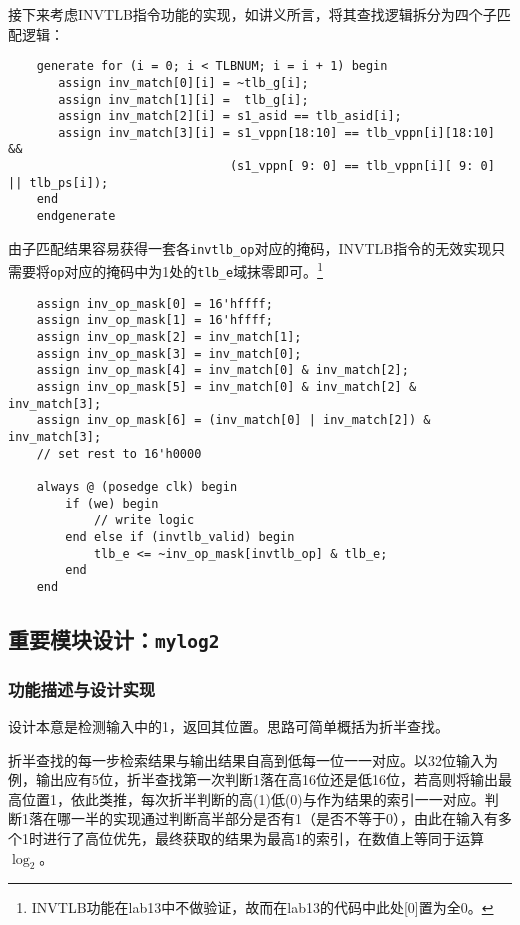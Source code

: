\documentclass[UTF-8,twoside,c5size]{ctexart}
\begin{document}
    接下来考虑INVTLB指令功能的实现，如讲义所言，将其查找逻辑拆分为四个子匹配逻辑：
    \begin{verbatim}
    generate for (i = 0; i < TLBNUM; i = i + 1) begin
       assign inv_match[0][i] = ~tlb_g[i];
       assign inv_match[1][i] =  tlb_g[i];
       assign inv_match[2][i] = s1_asid == tlb_asid[i];
       assign inv_match[3][i] = s1_vppn[18:10] == tlb_vppn[i][18:10]            &&
                               (s1_vppn[ 9: 0] == tlb_vppn[i][ 9: 0] || tlb_ps[i]);
    end        
    endgenerate
    \end{verbatim}
    
    由子匹配结果容易获得一套各\texttt{invtlb\_op}对应的掩码，INVTLB指令的无效实现只需要将\texttt{op}对应的掩码中为1处的\texttt{tlb\_e}域抹零即可。\footnote{INVTLB功能在lab13中不做验证，故而在lab13的代码中此处[0]置为全0。}
    
    \begin{verbatim}
    assign inv_op_mask[0] = 16'hffff;
    assign inv_op_mask[1] = 16'hffff;
    assign inv_op_mask[2] = inv_match[1];
    assign inv_op_mask[3] = inv_match[0];
    assign inv_op_mask[4] = inv_match[0] & inv_match[2];
    assign inv_op_mask[5] = inv_match[0] & inv_match[2] & inv_match[3];
    assign inv_op_mask[6] = (inv_match[0] | inv_match[2]) & inv_match[3];
    // set rest to 16'h0000
    
    always @ (posedge clk) begin
        if (we) begin
            // write logic
        end else if (invtlb_valid) begin
            tlb_e <= ~inv_op_mask[invtlb_op] & tlb_e;
        end
    end
    \end{verbatim}
    
    \subsection{重要模块设计：\texttt{mylog2}}
    \subsubsection{功能描述与设计实现}
    
    设计本意是检测输入中的1，返回其位置。思路可简单概括为折半查找。
    
    折半查找的每一步检索结果与输出结果自高到低每一位一一对应。以32位输入为例，输出应有5位，折半查找第一次判断1落在高16位还是低16位，若高则将输出最高位置1，依此类推，每次折半判断的高(1)低(0)与作为结果的索引一一对应。判断1落在哪一半的实现通过判断高半部分是否有1（是否不等于0），由此在输入有多个1时进行了高位优先，最终获取的结果为最高1的索引，在数值上等同于运算$ \log_2 $。
    
\end{document}
